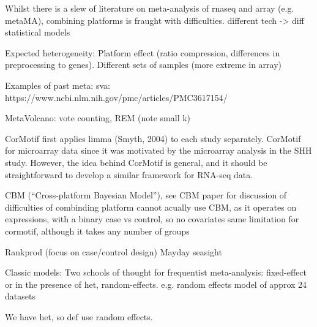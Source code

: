 \begin{outline}

\1 Whilst there is a slew of literature on meta-analysis of rnaseq and array (e.g. metaMA), combining platforms is fraught with difficulties.
    \2 different tech -> diff statistical models

\1 Expected heterogeneity:
    \2 Platform effect (ratio compression, differences in preprocessing to genes). 
    \2 Different sets of samples (more extreme in array)

\1 Examples of past meta:
    \2 sva: https://www.ncbi.nlm.nih.gov/pmc/articles/PMC3617154/

    \2 MetaVolcano: vote counting, REM (note small k)

    \2 CorMotif first applies limma (Smyth, 2004) to each study separately.
        \3 CorMotif for microarray data since it was motivated by the microarray analysis in the SHH study. However, the idea behind CorMotif is general, and it should be straightforward to develop a similar framework for RNA-seq data.

    \2 CBM (“Cross-platform Bayesian Model”), see CBM paper for discussion of difficulties of combinding platform
        \3 cannot acually use CBM, as it operates on expressions, with a binary case vs control, so no covariates
        \3 same limitation for cormotif, although it takes any number of groups

    \2 Rankprod (focus on case/control design)
    \2 Mayday seasight

\1 Classic models: Two schools of thought for frequentist meta-analysis: 
    \2 fixed-effect
    \2 or in the presence of het, random-effects.
        \3 e.g. random effects model of approx 24 datasets

    \2 We have het, so def use random effects.


\end{outline}
